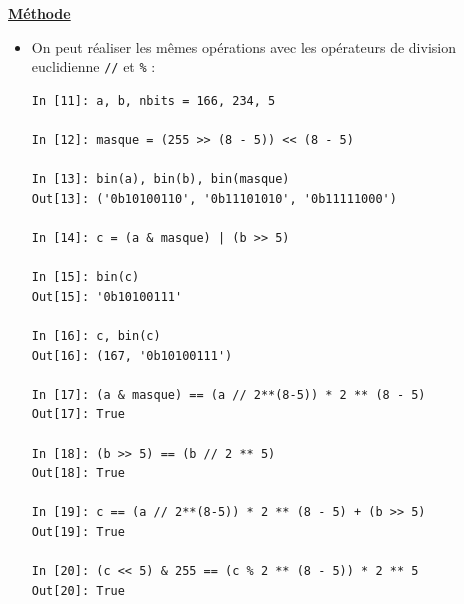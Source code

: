 \documentclass[a4paper, french, 12pt]{article}  %
\newenvironment{methode}[1]
{\par \medskip   \begin{framed} \noindent\underline{\textbf{Méthode}} \hspace{0.5cm}{\itshape #1} \vspace*{10pt} \par  }
{\end{framed} \par \medskip }
\begin{document}
\begin{methode}{Application à la stéganographie}
\begin{itemize}[label=]
\begin{itemize}
\item On peut réaliser les mêmes opérations  avec les opérateurs de division euclidienne \verb+//+ et \verb+%+ :

\begin{lstlisting}[style=compil]
In [11]: a, b, nbits = 166, 234, 5                                              

In [12]: masque = (255 >> (8 - 5)) << (8 - 5)                                   

In [13]: bin(a), bin(b), bin(masque)                                            
Out[13]: ('0b10100110', '0b11101010', '0b11111000')

In [14]: c = (a & masque) | (b >> 5)                                             

In [15]: bin(c)                                                                 
Out[15]: '0b10100111'

In [16]: c, bin(c)                                                              
Out[16]: (167, '0b10100111')

In [17]: (a & masque) == (a // 2**(8-5)) * 2 ** (8 - 5)                         
Out[17]: True

In [18]: (b >> 5) == (b // 2 ** 5)                                              
Out[18]: True

In [19]: c == (a // 2**(8-5)) * 2 ** (8 - 5) + (b >> 5)                         
Out[19]: True

In [20]: (c << 5) & 255 == (c % 2 ** (8 - 5)) * 2 ** 5                          
Out[20]: True
\end{lstlisting}

\end{itemize}

\end{itemize}


\end{methode}
\end{document}
